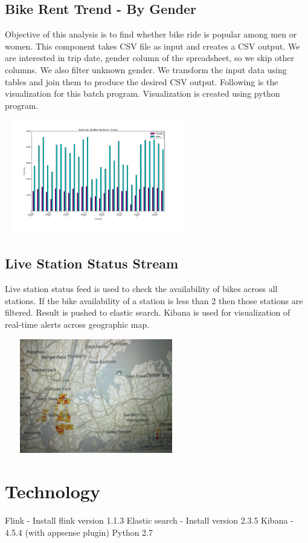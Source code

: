 \documentclass{sig-alternate-05-2015}
\begin{document}
\subsection {Bike Rent Trend - By Gender}
Objective of this analysis is to find whether bike ride is popular among men or women. This component takes CSV file as input and creates a CSV output. We are interested in trip date, gender column of the spreadsheet, so we skip other columns. We also filter unknown gender. We transform the input data using tables
and join them to produce the desired CSV output. Following is the visualization for this batch program. Visualization is created using python program.

\includegraphics[width=8cm, height=5cm]{tripsbygender}

\subsection {Live Station Status Stream}
Live station status feed is used to check the availability of bikes across all stations. If the bike availability of a station is less than 2 then those stations are filtered. Result is pushed to elastic search. Kibana is used for visualization of real-time alerts across geographic map.

\includegraphics[width=8cm, height=5cm]{bikealerts}

\section {Technology}
Flink - Install flink version 1.1.3\break
Elastic search - Install version 2.3.5\break
Kibana - 4.5.4 (with appsense plugin)\break
Python 2.7\break
\end{document}
